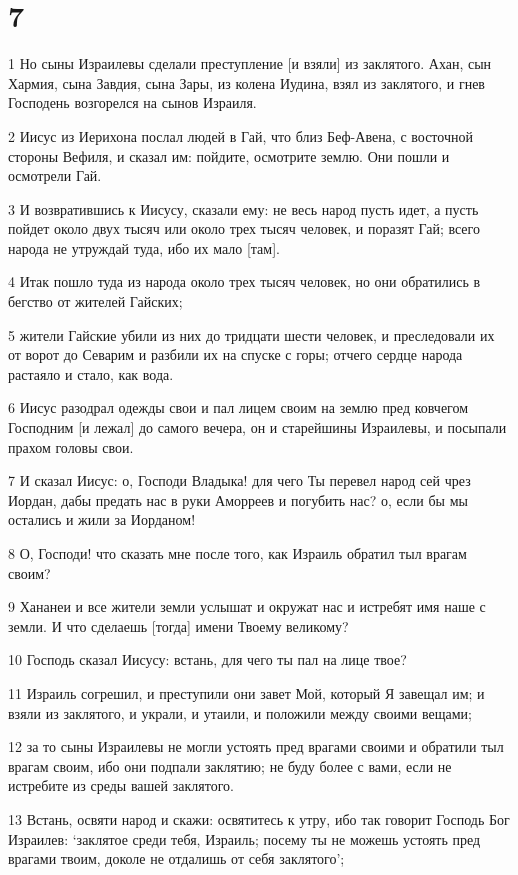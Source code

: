 \chapter{7}

\par 1 Но сыны Израилевы сделали преступление [и взяли] из заклятого. Ахан, сын Хармия, сына Завдия, сына Зары, из колена Иудина, взял из заклятого, и гнев Господень возгорелся на сынов Израиля.
\par 2 Иисус из Иерихона послал людей в Гай, что близ Беф-Авена, с восточной стороны Вефиля, и сказал им: пойдите, осмотрите землю. Они пошли и осмотрели Гай.
\par 3 И возвратившись к Иисусу, сказали ему: не весь народ пусть идет, а пусть пойдет около двух тысяч или около трех тысяч человек, и поразят Гай; всего народа не утруждай туда, ибо их мало [там].
\par 4 Итак пошло туда из народа около трех тысяч человек, но они обратились в бегство от жителей Гайских;
\par 5 жители Гайские убили из них до тридцати шести человек, и преследовали их от ворот до Севарим и разбили их на спуске с горы; отчего сердце народа растаяло и стало, как вода.
\par 6 Иисус разодрал одежды свои и пал лицем своим на землю пред ковчегом Господним [и лежал] до самого вечера, он и старейшины Израилевы, и посыпали прахом головы свои.
\par 7 И сказал Иисус: о, Господи Владыка! для чего Ты перевел народ сей чрез Иордан, дабы предать нас в руки Аморреев и погубить нас? о, если бы мы остались и жили за Иорданом!
\par 8 О, Господи! что сказать мне после того, как Израиль обратил тыл врагам своим?
\par 9 Хананеи и все жители земли услышат и окружат нас и истребят имя наше с земли. И что сделаешь [тогда] имени Твоему великому?
\par 10 Господь сказал Иисусу: встань, для чего ты пал на лице твое?
\par 11 Израиль согрешил, и преступили они завет Мой, который Я завещал им; и взяли из заклятого, и украли, и утаили, и положили между своими вещами;
\par 12 за то сыны Израилевы не могли устоять пред врагами своими и обратили тыл врагам своим, ибо они подпали заклятию; не буду более с вами, если не истребите из среды вашей заклятого.
\par 13 Встань, освяти народ и скажи: освятитесь к утру, ибо так говорит Господь Бог Израилев: `заклятое среди тебя, Израиль; посему ты не можешь устоять пред врагами твоим, доколе не отдалишь от себя заклятого';
